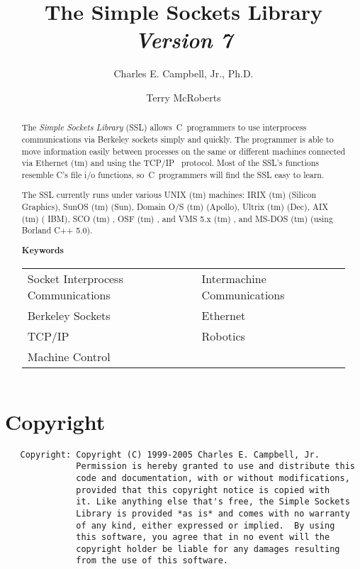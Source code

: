 \documentclass[12pt]{article}
\title{\textbf{The Simple Sockets Library \\ \normalsize\em Version 7}}
\author{Charles E. Campbell, Jr., {\normalsize Ph.D.} \and Terry McRoberts}
\def\SSL{{\small SSL}}
\def\TCP{{\small TCP/IP }}
\def\TradeMark{{\tiny (tm) }}
\renewcommand{\thepage}{}
\begin{document}
\maketitle

\begin{abstract}
{
The {\em Simple Sockets Library} (\SSL) allows~C~programmers to use
interprocess communications via Berkeley sockets simply and quickly.
The programmer is able to move information easily between processes
on the same or different machines connected via Ethernet \TradeMark and using
the \TCP\ protocol.  Most of the \SSL's functions resemble C's file i/o
functions, so~C~programmers will find the {\SSL} easy to learn.
\vspace{1ex}

The {\SSL} currently runs under various {\small UNIX \TradeMark} machines:
{\small IRIX \TradeMark} (Silicon Graphics), SunOS \TradeMark (Sun), Domain O/S
\TradeMark (Apollo), Ultrix \TradeMark (Dec), {\small AIX \TradeMark} ({\small
IBM}), {\small SCO \TradeMark}, {\small OSF \TradeMark}, and {\small VMS} 5.x
\TradeMark, and {\small MS-DOS \TradeMark} (using Borland C++ 5.0).
}

\vspace{.25in}
\begin{table}[h]
  \begin{center}
  \small
  {\bf Keywords}   \footnotesize
  \begin{tabular}{ll}
    Socket Interprocess Communications  & Intermachine Communications \\
    Berkeley Sockets                    & Ethernet                    \\
    {\TCP}                                & Robotics                    \\
    Machine Control                     &
  \end{tabular}
  \end{center}
\end{table}

\end{abstract}

\titlepage
\tableofcontents
\newpage
\setcounter{page}{1}
\renewcommand{\thepage}{\arabic{page}}

\section{Copyright}
    \begin{verbatim}
   Copyright: Copyright (C) 1999-2005 Charles E. Campbell, Jr.
              Permission is hereby granted to use and distribute this
              code and documentation, with or without modifications,
              provided that this copyright notice is copied with
              it. Like anything else that's free, the Simple Sockets
              Library is provided *as is* and comes with no warranty
              of any kind, either expressed or implied.  By using
              this software, you agree that in no event will the
              copyright holder be liable for any damages resulting
              from the use of this software.
    \end{verbatim}
\end{document}
